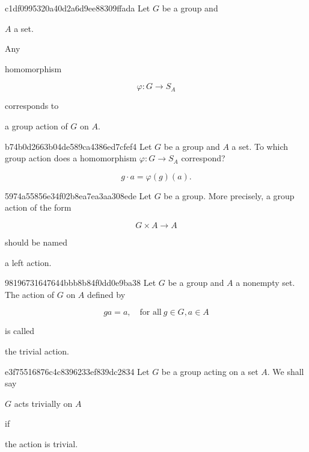 \begin{note}{c1df0995320a40d2a6d9ee88309ffada}
    Let \({ G }\) be a group and \begin{icloze}{5}\({ A }\) a set.\end{icloze}
    Any \begin{icloze}{3}homomorphism\end{icloze}
    \begin{icloze}{1}
        \[
            \varphi : G \to S_{A}
        \]
    \end{icloze}
    corresponds to \begin{icloze}{2}a group action of \({ G }\) on \({ A }\).\end{icloze}
\end{note}

\begin{note}{b74b0d2663b04de589ca4386ed7cfef4}
    Let \({ G }\) be a group and \({ A }\) a set.
    To which group action does a homomorphism \({ \varphi : G \to S_{A}  }\) correspond?

    \begin{cloze}{1}
        \[
            g \cdot a = \varphi(g)(a).
        \]
    \end{cloze}
\end{note}

\begin{note}{5974a55856e34f02b8ea7ea3aa308ede}
    Let \({ G }\) be a group.
    More precisely, a group action of the form
    \begin{icloze}{2}
        \[
            G \times A \to A
        \]
    \end{icloze}
    should be named \begin{icloze}{1}a left action.\end{icloze}
\end{note}

\begin{note}{98196731647644bbb8b84f0dd0e9ba38}
    Let \({ G }\) be a group and \({ A }\) a nonempty set.
    The action of \({ G }\) on \({ A }\) defined by
    \begin{icloze}{1}
        \[
            ga = a, \quad \text{for all}\ g \in G, a \in A
        \]
    \end{icloze}
    is called \begin{icloze}{2}the trivial action.\end{icloze}
\end{note}

\begin{note}{e3f75516876c4c8396233ef839dc2834}
    Let \({ G }\) be a group acting on a set \({ A }\).
    We shall say \begin{icloze}{2}\({ G }\) acts trivially on \({ A }\)\end{icloze} if \begin{icloze}{1}the action is trivial.\end{icloze}
\end{note}

